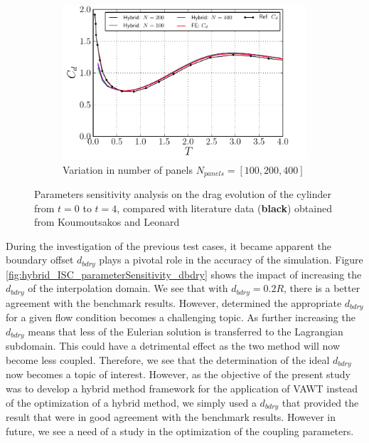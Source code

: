 \begin{figure}[!p]
     \begin{subfigure}[b]{0.49\textwidth}
             \includegraphics[width=\textwidth]{./figures/validation/isc/hybrid_ISC_drag_nPanel.pdf}
             \caption{Variation in number of panels $N_{panels} = [100,200,400]$}
             \label{fig:hybrid_ISC_drag_nPanelComparison}
	 \end{subfigure}
    
     \caption{Parameters sensitivity analysis on the drag evolution of the cylinder from $t=0$ to $t=4$, compared with literature data (\textbf{black}) obtained from Koumoutsakos and Leonard \cite{Koumoutsakos1995a}}
     \label{fig:hybrid_ISC_parameterSensitivity}
	\end{figure}
	



During the investigation of the previous test cases, it became apparent the boundary offset $d_{bdry}$ plays a pivotal role in the accuracy of the simulation. Figure \ref{fig:hybrid_ISC_parameterSensitivity_dbdry} shows the impact of increasing the $d_{bdry}$ of the interpolation domain. We see that with $d_{bdry}=0.2R$, there is a better agreement with the benchmark results. However, determined the appropriate $d_{bdry}$ for a given flow condition becomes a challenging topic. As further increasing the $d_{bdry}$ means that less of the Eulerian solution is transferred to the Lagrangian subdomain. This could have a detrimental effect as the two method will now become less coupled. Therefore, we see that the determination of the ideal $d_{bdry}$ now becomes a topic of interest. However, as the objective of the  present study was to develop a hybrid method framework for the application of VAWT instead of the optimization of a hybrid method, we simply used a $d_{bdry}$ that provided the result that were in good agreement with the benchmark results. However in future, we see a need of a study in the optimization of the coupling parameters.


